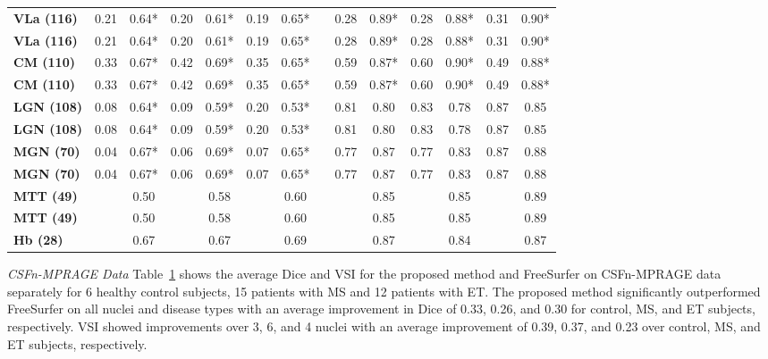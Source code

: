 \begin{table}[]
{\begin{tabular}{lccccccccccccc}
\rowcolor[HTML]{FFFFFF}
\cellcolor[HTML]{D9D9D9}\textbf{VLa (116)} & 0.21 & 0.64* & 0.20 & 0.61* & 0.19 & 0.65* & & 0.28 & 0.89* & 0.28 & 0.88* & 0.31 & 0.90* \\
\cellcolor[HTML]{D9D9D9}\textbf{VLa (116)} & 0.21 & 0.64* & 0.20 & 0.61* & 0.19 & 0.65* & & 0.28 & 0.89* & 0.28 & 0.88* & 0.31 & 0.90* \\
\rowcolor[HTML]{FFFFFF}
\cellcolor[HTML]{D9D9D9}\textbf{CM (110)} & 0.33 & 0.67* & 0.42 & 0.69* & 0.35 & 0.65* & & 0.59 & 0.87* & 0.60 & 0.90* & 0.49 & 0.88* \\
\cellcolor[HTML]{D9D9D9}\textbf{CM (110)} & 0.33 & 0.67* & 0.42 & 0.69* & 0.35 & 0.65* & & 0.59 & 0.87* & 0.60 & 0.90* & 0.49 & 0.88* \\
\rowcolor[HTML]{FFFFFF}
\cellcolor[HTML]{D9D9D9}\textbf{LGN (108)} & 0.08 & 0.64* & 0.09 & 0.59* & 0.20 & 0.53* & & 0.81 & 0.80 & 0.83 & 0.78 & 0.87 & 0.85 \\
\cellcolor[HTML]{D9D9D9}\textbf{LGN (108)} & 0.08 & 0.64* & 0.09 & 0.59* & 0.20 & 0.53* & & 0.81 & 0.80 & 0.83 & 0.78 & 0.87 & 0.85 \\
\rowcolor[HTML]{FFFFFF}
\cellcolor[HTML]{D9D9D9}\textbf{MGN (70)} & 0.04 & 0.67* & 0.06 & 0.69* & 0.07 & 0.65* & & 0.77 & 0.87 & 0.77 & 0.83 & 0.87 & 0.88 \\
\cellcolor[HTML]{D9D9D9}\textbf{MGN (70)} & 0.04 & 0.67* & 0.06 & 0.69* & 0.07 & 0.65* & & 0.77 & 0.87 & 0.77 & 0.83 & 0.87 & 0.88 \\
\rowcolor[HTML]{FFFFFF}
\cellcolor[HTML]{D9D9D9}\textbf{MTT (49)} & & 0.50 & & 0.58 & & 0.60 & & & 0.85 & & 0.85 & & 0.89 \\
\cellcolor[HTML]{D9D9D9}\textbf{MTT (49)} & & 0.50 & & 0.58 & & 0.60 & & & 0.85 & & 0.85 & & 0.89 \\
\rowcolor[HTML]{FFFFFF}
\cellcolor[HTML]{D9D9D9}\textbf{Hb (28)} & & 0.67 & & 0.67 & & 0.69 & & & 0.87 & & 0.84 & & 0.87
\end{tabular}
}\label{Thalamus.Table.4.Comparison.FreeSurfer}
\end{table}

\emph{CSFn-MPRAGE Data}
Table~\ref{Thalamus.Table.4.Comparison.FreeSurfer}  shows the average Dice and VSI for the proposed method and FreeSurfer on CSFn-MPRAGE data separately for 6 healthy control subjects, 15 patients with MS and 12 patients with ET. The proposed method significantly outperformed FreeSurfer on all nuclei and disease types with an average improvement in Dice of 0.33, 0.26, and 0.30 for control, MS, and ET subjects, respectively. VSI showed improvements over 3, 6, and 4 nuclei with an average improvement of 0.39, 0.37, and 0.23 over control, MS, and ET subjects, respectively.


